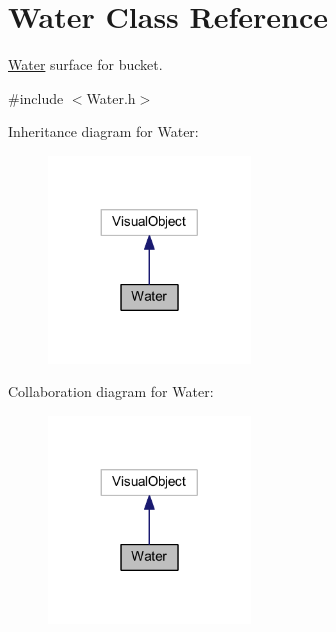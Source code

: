 \hypertarget{class_water}{}\section{Water Class Reference}
\label{class_water}


\mbox{\hyperlink{class_water}{Water}} surface for bucket.  




{\ttfamily \#include $<$Water.\+h$>$}



Inheritance diagram for Water\+:
\nopagebreak
\begin{figure}[H]
\begin{center}
\leavevmode
\includegraphics[width=152pt]{class_water__inherit__graph}
\end{center}
\end{figure}


Collaboration diagram for Water\+:
\nopagebreak
\begin{figure}[H]
\begin{center}
\leavevmode
\includegraphics[width=152pt]{class_water__coll__graph}
\end{center}
\end{figure}
